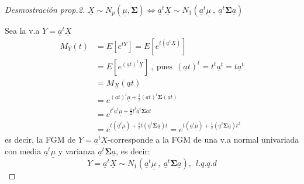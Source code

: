 \documentclass[
]{book}
\theoremstyle{definition}
\theoremstyle{definition}
\theoremstyle{definition}
\theoremstyle{definition}
\theoremstyle{remark}
\begin{document}
\begin{proof}[Desmostración prop.2]
\(\underline{X}\sim N_p(\underline{\mu},\mathbf{\Sigma}) \Longleftrightarrow \underline{a}^t \underline{X}\sim N_1(\underline{a}^t\underline{\mu}\ ,\ \underline{a}^t \mathbf{\Sigma} \underline{a})\)

Sea la v.a \(Y=\underline{a}^t\underline{X}\)
\begin{align*}
M_Y(t)&=E[e^{tY}]=E[e^{t(\underline{a}^t\underline{X})}]\\
&=E[e^{(\underline{a}t)^t\underline{X}}]\ , \ \text{pues} \ \ (\underline{a}t)^t=t^t\underline{a}^t=t\underline{a}^t\\
&=M_{\underline{X}}(\underline{a}t)\\
&=e^{(\underline{a}t)^t\underline{\mu} +\frac{1}{2}(\underline{a}t)^t\mathbf{\Sigma}(\underline{a}t)}\\
&=e^{t^t\underline{a}^t\underline{\mu} +\frac{1}{2}t^t\underline{a}^t\mathbf{ \Sigma} \underline{a}t}\\
&=e^{t(\underline{a}^t\underline{\mu}) +\frac{1}{2}t(\underline{a}^t\mathbf{\Sigma} \underline{a})t}
=e^{t (\underline{a}^t\underline{\mu}) +\frac{1}{2} (\underline{a}^t\mathbf{\Sigma} \underline{a}) t^2}
\end{align*}
es decir, la FGM de \(Y=\underline{a}^t\underline{X}\)-corresponde a la FGM de una v.a normal univariada con media \(\underline{a}^t\underline{\mu}\) y varianza \(\underline{a}^t\mathbf{\Sigma} \underline{a}\), es decir:
\[
Y=\underline{a}^t\underline{X}\sim N_1\left(\underline{a}^t\underline{\mu}\ , \ \underline{a}^t\mathbf{\Sigma} \underline{a}\right), \ \ l.q.q.d
\]
\end{proof}
\end{document}
